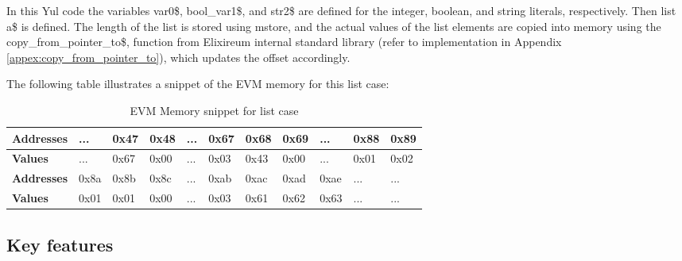 In this Yul code the variables var0\$, bool\_var1\$, and str2\$ are defined for the integer, boolean, and string literals, respectively. Then list a\$ is defined. The length of the list is stored using mstore, and the actual values of the list elements are copied into memory using the copy\_from\_pointer\_to\$, function from Elixireum internal standard library (refer to implementation in Appendix \ref{appex:copy_from_pointer_to}), which updates the offset accordingly.

The following table illustrates a snippet of the EVM memory for this list case:
\begin{table}[h!]
  \centering
  \renewcommand{\arraystretch}{1.2} %
  \begin{tabular}{|>{\centering\arraybackslash}m{3cm}|>{\centering\arraybackslash}m{1cm}|>{\centering\arraybackslash}m{1cm}|>{\centering\arraybackslash}m{1cm}|>{\centering\arraybackslash}m{1cm}|>{\centering\arraybackslash}m{1cm}|>{\centering\arraybackslash}m{1cm}|>{\centering\arraybackslash}m{1cm}|>{\centering\arraybackslash}m{1cm}|>{\centering\arraybackslash}m{1cm}|>{\centering\arraybackslash}m{1cm}|}
  \hline
  \textbf{Addresses} & ... & 0x47 & 0x48 & ... & 0x67 & 0x68 & 0x69 & ... & 0x88 & 0x89 \\ \hline
  \textbf{Values}    & ... & 0x67 & 0x00 & ... & 0x03 & 0x43 & 0x00 & ... & 0x01 & 0x02 \\ \hline \hline
  \textbf{Addresses} & 0x8a & 0x8b & 0x8c & ... & 0xab & 0xac & 0xad & 0xae & ... & ... \\ \hline
  \textbf{Values}    & 0x01 & 0x01 & 0x00 & ... & 0x03 & 0x61 & 0x62 & 0x63 & ... & ... \\ \hline
  \end{tabular}
  \caption{EVM Memory snippet for list case}
  \label{tab:evm_memory_aux} 
  \end{table}

\subsection{Key features}
\label{sec:key_features}

